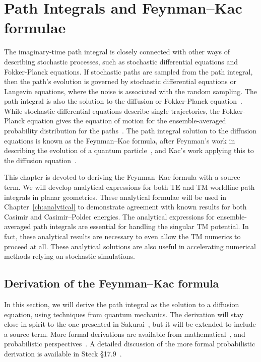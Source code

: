 \chapter{Path Integrals and Feynman--Kac formulae}

\label{ch:feynman_kac}

The imaginary-time path integral is closely connected with other ways of describing stochastic processes, 
such as stochastic differential equations and Fokker-Planck equations.
If stochastic paths are sampled from the path integral, then the path's evolution is governed by stochastic
differential equations or Langevin equations, where the noise is associated with the random sampling.
The path integral is also the solution to the diffusion or Fokker-Planck equation~\cite{Karatzas1991, Durrett1996}.
While stochastic differential equations describe single trajectories, the Fokker-Planck equation gives
the equation of motion for the ensemble-averaged probability distribution for the paths~\cite{Gardiner2009}.
The path integral solution to the diffusion equations is known as the Feynman--Kac formula,
after Feynman's work in describing the evolution of a quantum particle~\cite{Feynman1948},  and Kac's
work applying this to the diffusion equation~\cite{Kac1949}.

This chapter is devoted to deriving the Feynman--Kac formula with a source term.
We will develop analytical expressions for both TE and TM worldline path integrals 
in planar geometries.
These analytical formulae will be used in Chapter~\ref{ch:analytical} to demonstrate agreement 
with known results for both Casimir and Casimir--Polder energies.
The analytical expressions for ensemble-averaged path integrals are essential for handling the singular 
TM potential.  
In fact, these analytical results are necessary to even allow the TM numerics to proceed at all.
These analytical solutions are also useful in accelerating numerical methods relying 
on stochastic simulations.  

\section{Derivation of the Feynman--Kac formula }

In this section, we will derive the path integral as the solution to a diffusion equation,
using techniques from quantum mechanics.
The derivation will stay close in spirit to the one presented in Sakurai~\cite{Sakurai1994}, but it will
be extended to include a source term.%
More formal derivations are available from mathematical~\cite{Cartier2004},
and probabilistic perspectives~\cite{Karatzas1991, Durrett1996}.  
A detailed discussion of the more formal probabilistic derivation is available in Steck \S 17.9~\cite{SteckNotes}.

